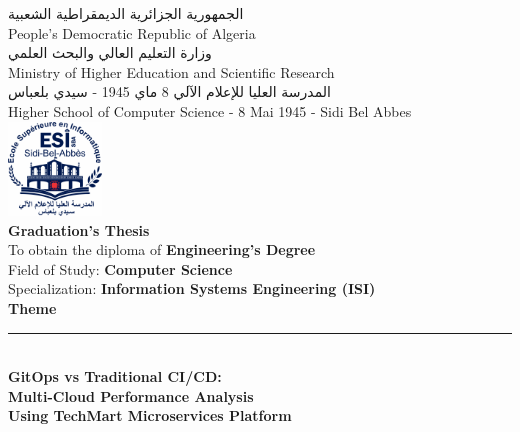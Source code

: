 \thispagestyle{empty}

\begin{center}

{\footnotesize \textarabic{الجمهورية الجزائرية الديمقراطية الشعبية}} \\[0.05cm]
{\footnotesize People's Democratic Republic of Algeria} \\[0.1cm]

{\footnotesize \textarabic{وزارة التعليم العالي والبحث العلمي}} \\[0.05cm]
{\footnotesize Ministry of Higher Education and Scientific Research} \\[0.1cm]

{\footnotesize \textarabic{المدرسة العليا للإعلام الآلي 8 ماي 1945 - سيدي بلعباس}} \\[0.05cm]
{\footnotesize Higher School of Computer Science - 8 Mai 1945 - Sidi Bel Abbes} \\[0.2cm]

\includegraphics[width=2.5cm]{figures/logos/esi-sba-logo.png} \\[0.15cm]

{\Large \textbf{Graduation's Thesis}} \\[0.3cm]

{\small To obtain the diploma of \textbf{Engineering's Degree}} \\[0.1cm]
{\small Field of Study: \textbf{Computer Science}} \\[0.1cm]
{\small Specialization: \textbf{Information Systems Engineering (ISI)}} \\[0.4cm]

{\large \textbf{Theme}} \\[0.2cm]
\rule{13cm}{0.5pt} \\[0.3cm]

{\large \textbf{GitOps vs Traditional CI/CD:}} \\[0.15cm]
{\large \textbf{Multi-Cloud Performance Analysis}} \\[0.15cm]
{\large \textbf{Using TechMart Microservices Platform}} \\[0.2cm]


\end{center}

